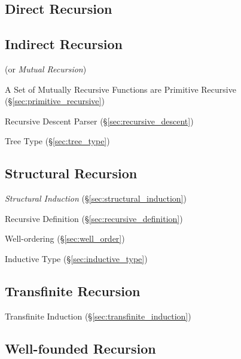 \subsection{Direct Recursion}\label{sec:direct_recursion}

\subsection{Indirect Recursion}\label{sec:indirect_recursion}

(or \emph{Mutual Recursion})

A Set of Mutually Recursive Functions are Primitive Recursive
(\S\ref{sec:primitive_recursive})

Recursive Descent Parser (\S\ref{sec:recursive_descent})

Tree Type (\S\ref{sec:tree_type})



\subsection{Structural Recursion}\label{sec:structural_recursion}

\emph{Structural Induction} (\S\ref{sec:structural_induction})

Recursive Definition (\S\ref{sec:recursive_definition})

Well-ordering (\S\ref{sec:well_order})

Inductive Type (\S\ref{sec:inductive_type})



\subsection{Transfinite Recursion}\label{sec:transfinite_recursion}

Transfinite Induction (\S\ref{sec:transfinite_induction})



\subsection{Well-founded Recursion}\label{sec:wellfounded_recursion}

